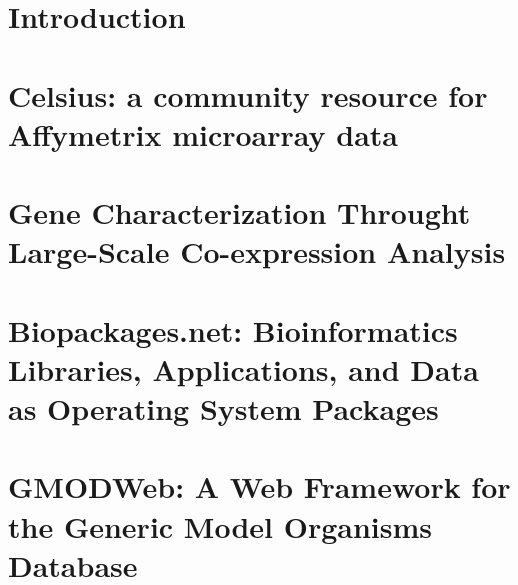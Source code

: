 \documentclass [PhD] {uclathes}
\title          {\dbthesis} %
\author         {Allen Jason Day}
\begin{document}
\makeintropages

%
%


\chapter{Introduction}


\chapter{Celsius: a community resource for Affymetrix microarray data}


\chapter{Gene Characterization Throught Large-Scale Co-expression Analysis}


%
%
%
%
\chapter{Biopackages.net: Bioinformatics Libraries, Applications, and Data as Operating System Packages}


\chapter{GMODWeb: A Web Framework for the Generic Model Organisms Database}

\end{document}
